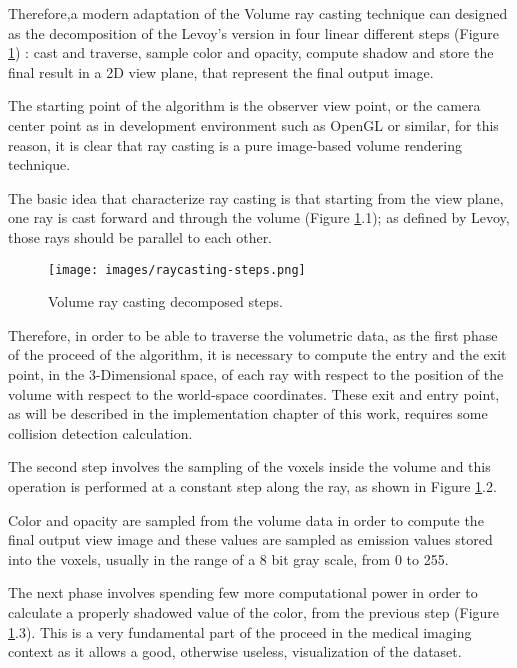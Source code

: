 \documentclass[12pt,a4paper]{extarticle}
\newcommand{\linespace}{\vspace{8pt}}
\begin{document}
Therefore,a modern adaptation of the Volume ray casting technique can designed as the decomposition of the Levoy's version in four linear different steps (Figure \ref{fig:raycastingsteps}) %
: cast and traverse, sample color and opacity, compute shadow and store the final result in a 2D view plane, that represent the final output image.



The starting point of the algorithm is the observer view point, or the camera center point as in development environment such as OpenGL or similar, for this reason, it is clear that ray casting is a pure image-based volume rendering technique.
\linespace

The basic idea that characterize ray casting is that starting from the view plane, one ray is cast forward and through the volume (Figure \ref{fig:raycastingsteps}.1); as defined by Levoy, those rays should be parallel to each other.

\begin{figure}[hbtp]
\centering
\texttt{[image: images/raycasting-steps.png]}
\caption{Volume ray casting decomposed steps.}
\label{fig:raycastingsteps}
\end{figure}

Therefore, in order to be able to traverse the volumetric data, as the first phase of the proceed of the algorithm, it is necessary to compute the entry and the exit point, in the 3-Dimensional space, of each ray with respect to the position of the volume with respect to the world-space coordinates. %
These exit and entry point, as will be described in the implementation chapter of this work, requires some collision detection calculation. 
\linespace

The second step involves the sampling of the voxels inside the volume and this operation is performed at a constant step along the ray, as shown in Figure \ref{fig:raycastingsteps}.2.

Color and opacity are sampled from the volume data in order to compute the final output view image and these values are sampled as emission values stored into the voxels, usually in the range of a 8 bit gray scale, from 0 to 255.
\linespace

The next phase involves spending few more computational power in order to calculate a properly shadowed value of the color, from the previous step (Figure \ref{fig:raycastingsteps}.3). This is a very fundamental part of the proceed in the medical imaging context as it allows a good, otherwise useless, visualization of the dataset.
\end{document}
